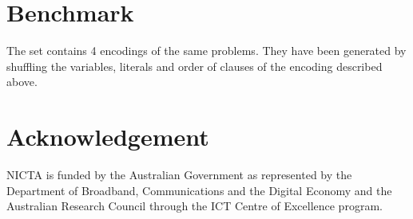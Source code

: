 \documentclass[conference]{IEEEtran}
\begin{document}
\section{Benchmark}

The set contains 4 encodings of the same problems. They have been generated by shuffling the variables, literals and
order of clauses of the encoding described above.

\section*{Acknowledgement}

NICTA is funded by the Australian Government as represented by the Department of Broadband, Communications and the
Digital Economy and the Australian Research Council through the ICT Centre of Excellence program.




\end{document}
